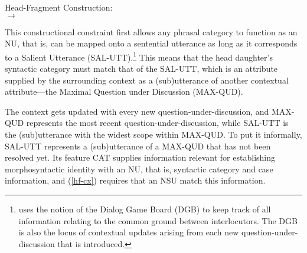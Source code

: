 {\ea
\label{hf-cx}
Head-Fragment Construction:\\
$\rightarrow$

\z
%
%
This constructional constraint first allows 
any phrasal category to function as an NU, that is, can be mapped onto a sentential utterance as long as it corresponds to a Salient Utterance (SAL-UTT).\footnote{\citet{Ginzburg2012} uses the notion of the Dialog Game Board (DGB) to keep track of all information relating to the common ground between interlocutors. The DGB is also the locus of contextual updates arising from each new question-under-discussion that is introduced.}
 This means that
the head daughter's syntactic category must match that of the SAL-UTT, which is an attribute supplied by the surrounding context as a (sub)utterance of another contextual attribute---the Maximal Question under Discussion (MAX-QUD). 

The context gets updated with every new question-under-discussion, and MAX-QUD represents the most recent question-under-discussion, while SAL-UTT is the (sub)utterance with the widest scope within MAX-QUD. To put it informally, SAL-UTT represents a (sub)utterance of a MAX-QUD that has not been resolved yet. Its feature CAT supplies information relevant for establishing morphosyntactic identity with an NU, that is, syntactic category and case information, and (\ref{hf-cx}) requires that an NSU  match this information. 

}
